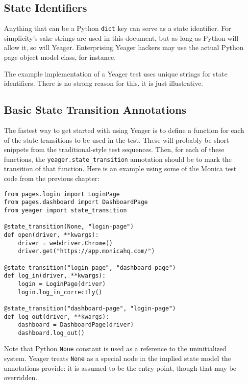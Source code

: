 \subsection{State Identifiers}
Anything that can be a Python \texttt{dict} key can serve as a state identifier. For simplicity's sake strings are used in this document, but as long as Python will allow it, so will Yeager. Enterprising Yeager hackers may use the actual Python page object model class, for instance.

The example implementation of a Yeager test uses unique strings for state identifiers. There is no strong reason for this, it is just illustrative.

\subsection{Basic State Transition Annotations}
The fastest way to get started with using Yeager is to define a function for each of the state transitions to be used in the test. These will probably be short snippets from the traditional-style test sequences. Then, for each of these functions, the \texttt{yeager.state\_transition} annotation should be to mark the transition of that function. Here is an example using some of the Monica test code from the previous chapter:

\pagebreak\begin{Verbatim}[fontsize=\small, baselinestretch=0.75]
from pages.login import LoginPage
from pages.dashboard import DashboardPage
from yeager import state_transition

@state_transition(None, "login-page")
def open(driver, **kwargs):
    driver = webdriver.Chrome()
    driver.get("https://app.monicahq.com/")

@state_transition("login-page", "dashboard-page")
def log_in(driver, **kwargs):
    login = LoginPage(driver)
    login.log_in_correctly()

@state_transition("dashboard-page", "login-page")
def log_out(driver, **kwargs):
    dashboard = DashboardPage(driver)
    dashboard.log_out()
\end{Verbatim}

Note that Python \texttt{None} constant is used as a reference to the uninitialized system. Yeager treats \texttt{None} as a special node in the implied state model the annotations provide: it is assumed to be the entry point, though that may be overridden.

